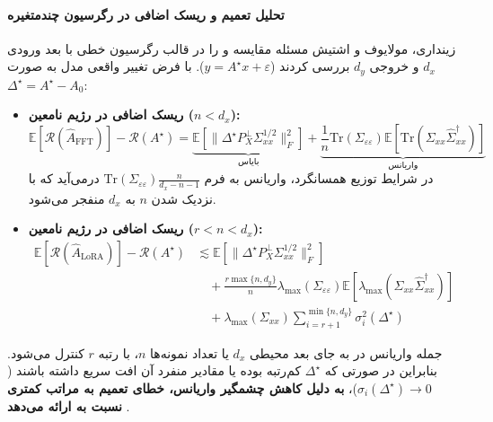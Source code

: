 \paragraph*{تحلیل تعمیم و ریسک اضافی در رگرسیون چندمتغیره}
زینداری، مولایوف و اشتیش \cite{zindari2026lora} مسئله مقایسه  و  را در قالب رگرسیون خطی با بعد ورودی $d_x$ و خروجی $d_y$ بررسی کردند ($y = A^\star x + \varepsilon$). با فرض تغییر واقعی مدل به صورت $\Delta^\star = A^\star - A_0$:
\begin{itemize}
    \item \textbf{ریسک اضافی  در رژیم نامعین ($n < d_x$):}
    \begin{equation}
        \mathbb{E}[\mathcal{R}(\hat{A}_{\text{FFT}})] - \mathcal{R}(A^\star) = \underbrace{\mathbb{E}\left[\|\Delta^\star P_X^\perp \Sigma_{xx}^{1/2}\|_F^2\right]}_{\text{بایاس}} + \underbrace{\frac{1}{n} \text{Tr}(\Sigma_{\varepsilon\varepsilon}) \mathbb{E}\left[\text{Tr}(\Sigma_{xx} \hat{\Sigma}_{xx}^\dagger)\right]}_{\text{واریانس}}
    \end{equation}
    در شرایط توزیع همسانگرد، واریانس به فرم $\text{Tr}(\Sigma_{\varepsilon\varepsilon}) \frac{n}{d_x - n - 1}$ درمی‌آید که با نزدیک شدن $n$ به $d_x$ منفجر می‌شود.
    \item \textbf{ریسک اضافی  در رژیم نامعین ($r < n < d_x$):}
    \begin{equation}
    \begin{split}
        \mathbb{E}[\mathcal{R}(\hat{A}_{\text{LoRA}})] - \mathcal{R}(A^\star) &\lesssim \mathbb{E}\left[\|\Delta^\star P_X^\perp \Sigma_{xx}^{1/2}\|_F^2\right] \\
        &\quad + \frac{r \max\{n, d_y\}}{n} \lambda_{\max}(\Sigma_{\varepsilon\varepsilon}) \mathbb{E}[\lambda_{\max}(\Sigma_{xx}\hat{\Sigma}_{xx}^\dagger)] \\
        &\quad + \lambda_{\max}(\Sigma_{xx}) \sum_{i=r+1}^{\min\{n, d_y\}} \sigma_i^2(\Delta^\star)
    \end{split}
    \end{equation}
\end{itemize}
جمله واریانس در  به جای بعد محیطی $d_x$ یا تعداد نمونه‌ها $n$، با رتبه $r$ کنترل می‌شود. بنابراین در صورتی که $\Delta^\star$ کم‌رتبه بوده یا مقادیر منفرد آن افت سریع داشته باشند ($\sigma_i(\Delta^\star) \to 0$)، \textbf{ به دلیل کاهش چشمگیر واریانس، خطای تعمیم به مراتب کمتری نسبت به  ارائه می‌دهد} \cite{zindari2026lora}.

